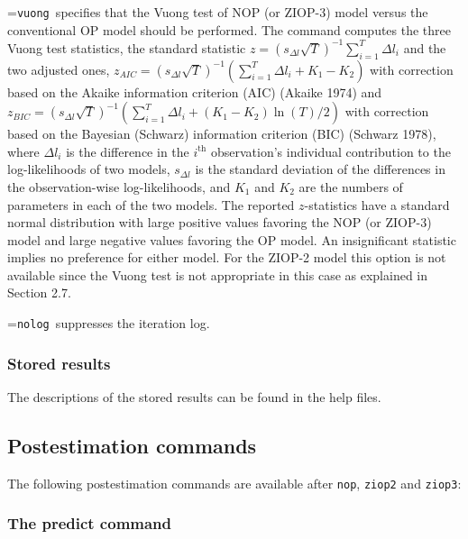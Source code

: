 \documentclass[letterpaper,fleqn,12pt]{article}
\begin{document}
\smallskip

\hangindent=\parindent\noindent \texttt{vuong }specifies that the Vuong test
of NOP (or ZIOP-3) model versus the conventional OP model should be
performed. The command computes the three Vuong test statistics, the
standard statistic $z=(s_{\Delta l}\sqrt{T})^{-1}\sum_{i=1}^{T}\Delta l_{i}$
and the two adjusted ones, $z_{AIC}=(s_{\Delta l}\sqrt{T})^{-1}\left(
\sum_{i=1}^{T}\Delta l_{i}+K_{1}-K_{2}\right) $  with correction based on
the Akaike information criterion (AIC) (Akaike 1974) and $z_{BIC}=(s_{\Delta
l}\sqrt{T})^{-1}\left( \sum_{i=1}^{T}\Delta l_{i}+(K_{1}-K_{2})\ln
(T)/2\right) $ with correction based on the Bayesian (Schwarz) information
criterion (BIC) (Schwarz 1978), where $\Delta l_{i}$ is the difference in
the $i^{\text{th}}$ observation's individual contribution to the
log-likelihoods of two models, $s_{\Delta l}$ is the standard deviation of
the differences in the observation-wise log-likelihoods, and $K_{1}$ and $%
K_{2}$ are the numbers of parameters in each of the two models. The reported 
$z$-statistics have a standard normal distribution with large positive
values favoring the NOP (or ZIOP-3) model and large negative values favoring
the OP model. An insignificant statistic implies no preference for either
model. For the ZIOP-2 model this option is not available since the Vuong
test is not appropriate in this case as explained in Section 2.7.

\smallskip

\hangindent=\parindent\noindent \texttt{nolog }suppresses the iteration log.

\subsubsection*{Stored results}

The descriptions of the stored results can be found in the help files.

\subsection{Postestimation commands}

The following postestimation commands are available after \texttt{nop}, 
\texttt{ziop2} and \texttt{ziop3}:

\subsubsection*{The predict command}
\end{document}
